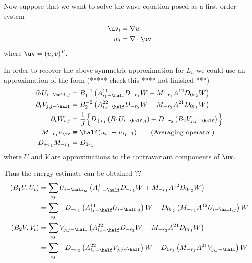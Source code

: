 \documentclass[10pt]{article}
\newcommand{\grad}{\nabla}
\begin{document}
Now suppose that we want to solve the wave equation posed as a first order system
\begin{align*}
  \uv_t &= \grad w \\
  w_t &= \grad\cdot \uv
\end{align*}
where $\uv=(u,v)^T$.

In order to recover the above symmetric approximation for $L_h$ we could use an approximation of
the form (***** check this **** not finished ***)
\begin{align*}
  \partial_t U_{i\mh,j} &= B_1^{-1}\left( A^{11}_{i_1-\half}D_{- r_1}W +  M_{- r_1} A^{12} D_{0 r_2}W\right) \\
  \partial_t V_{j,j\mh} &= B_2^{-2}\left( A^{22}_{i_2-\half}D_{- r_2}W +  M_{- r_2} A^{21} D_{0 r_1}W \right)\\
  \partial_t W_{i,j} &= {1\over J} \Big\lbrace
        D_{+ r_1}\left( B_1 U_{i\mh,j} \right) +
        D_{+ r_2}\left( B_2 V_{j,j\mh} \right) \Big\rbrace \\
  M_{- r_1} u_\iv &\equiv \half( u_{i_1} + u_{i_1-1} ) \qquad \mbox{(Averaging operator)}\\
  D_{+ r_1}M_{- r_1} &= D_{0 r_1} 
\end{align*}
where $U$ and $V$ are approximations to the contravariant components of $\uv$.

Thus the energy estimate can be obtained ??
\begin{align*}
  (B_1 U, U_t) &= 
    \sum_{ij}   U_{i\mh,j} \left( A^{11}_{i_1-\half}D_{- r_1}W +  M_{- r_1} A^{12} D_{0 r_2}W\right) \\
    &= \sum_{ij}   -D_{+r_1} \left( A^{11}_{i_1-\half} U_{i\mh,j} \right) W
                   -D_{0 r_2}\left( M_{- r_1} A^{12} U_{i\mh,j}\right) W \\
  (B_2 V, V_t) &= 
       \sum_{ij} V_{j,j\mh} \left( A^{22}_{i_2-\half}D_{- r_2}W +  M_{- r_2} A^{21} D_{0 r_1}W \right) \\
    &= \sum_{ij} -D_{+ r_2}\left( A^{22}_{i_2-\half} V_{j,j\mh} \right) W
                 -D_{0 r_1}\left(M_{- r_2} A^{21} V_{j,j\mh} \right) W
\end{align*}
\end{document}
